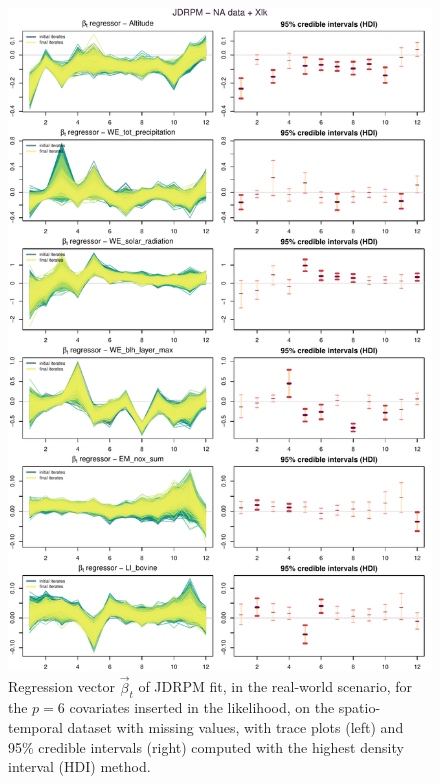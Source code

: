 \documentclass[12pt,	%
	a4paper,		%
	twoside,		%
	openright,		%
	titlepage,%
	]{book}
\theoremstyle{definition}
\begin{document}
\begin{figure}[!p]
    \centering
    \includegraphics[width=1\linewidth]{Testing/Covariates/better likelihood plots/up_LINES_beta_TR_plus_CIJDRPM - NA data + Xlk.pdf}
    \caption[Regression vector of JDRPM, covariates in the likelihood, dataset with missing values]{Regression vector $\vec{\beta}_t$ of JDRPM fit, in the real-world scenario, for the $p=6$ covariates inserted in the likelihood, on the spatio-temporal dataset with missing values, with trace plots (left) and 95\% credible intervals (right) computed with the highest density interval (HDI) method.}
    \label{fig: lk regressor altitude and friends NA}
\end{figure}
\end{document}
